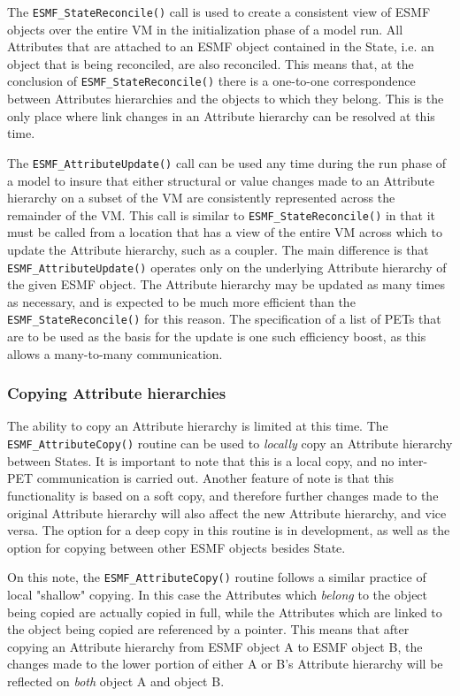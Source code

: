 The {\tt ESMF\_StateReconcile()} call is used to create a consistent view of ESMF objects over the entire VM in the initialization phase of a model run.  All Attributes that are attached to an ESMF object contained in the State, i.e. an object that is being reconciled, are also reconciled.  This means that, at the conclusion of {\tt ESMF\_StateReconcile()} there is a one-to-one correspondence between Attributes hierarchies and the objects to which they belong.  This is the only place where link changes in an Attribute hierarchy can be resolved at this time.

The {\tt ESMF\_AttributeUpdate()} call can be used any time during the run phase of a model to insure that either structural or value changes made to an Attribute hierarchy on a subset of the VM are consistently represented across the remainder of the VM.  This call is similar to {\tt ESMF\_StateReconcile()} in that it must be called from a location that has a view of the entire VM across which to update the Attribute hierarchy, such as a coupler.  The main difference is that {\tt ESMF\_AttributeUpdate()} operates only on the underlying Attribute hierarchy of the given ESMF object.  The Attribute hierarchy may be updated as many times as necessary, and is expected to be much more efficient than the {\tt ESMF\_StateReconcile()} for this reason.  The specification of a list of PETs that are to be used as the basis for the update is one such efficiency boost, as this allows a many-to-many communication.

\subsubsection{Copying Attribute hierarchies}

The ability to copy an Attribute hierarchy is limited at this time.  The {\tt ESMF\_AttributeCopy()} routine can be used to {\it locally} copy an Attribute hierarchy between States.  It is important to note that this is a local copy, and no inter-PET communication is carried out.  Another feature of note is that this functionality is based on a soft copy, and therefore further changes made to the original Attribute hierarchy will also affect the new Attribute hierarchy, and vice versa.  The option for a deep copy in this routine is in development, as well as the option for copying between other ESMF objects besides State.  

On this note, the {\tt ESMF\_AttributeCopy()} routine follows a similar practice of local "shallow" copying.  In this case the Attributes which {\it belong} to the object being copied are actually copied in full, while the Attributes which are linked to the object being copied are referenced by a pointer.  This means that after copying an Attribute hierarchy from ESMF object A to ESMF object B, the changes made to the lower portion of either A or B's Attribute hierarchy will be reflected on {\it both} object A and object B.




